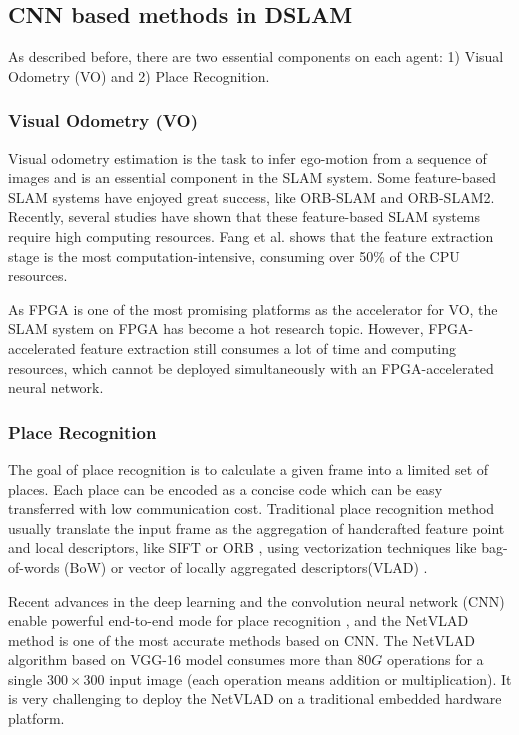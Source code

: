 \label{sec:background}
\subsection{CNN based methods in DSLAM}
As described before, there are two essential components on each agent: 1) Visual Odometry (VO) and 2) Place Recognition.

\subsubsection{Visual Odometry (VO)}

Visual odometry estimation is the task to infer ego-motion from a sequence of images and is an essential component in the SLAM system. Some feature-based SLAM systems have enjoyed great success, like ORB-SLAM\cite{DBLP:journals/trob/Mur-ArtalMT15} and ORB-SLAM2\cite{Mur-Artal:2017281}. Recently, several studies have shown that these feature-based SLAM systems require high computing resources. Fang et al.\cite{Fang2017FPGAbasedOF} shows that the feature extraction stage is the most computation-intensive, consuming over 50\% of the CPU resources.

As FPGA is one of the most promising platforms as the accelerator for VO, the SLAM system on FPGA has become a hot research topic. However, FPGA-accelerated feature extraction still consumes a lot of time and computing resources, which cannot be deployed simultaneously with an FPGA-accelerated neural network.

\subsubsection{Place Recognition}

The goal of place recognition is to calculate a given frame into a limited set of places. Each place can be encoded as a concise code which can be easy transferred with low communication cost. Traditional place recognition method usually translate the input frame as the aggregation of handcrafted feature point and local descriptors, like SIFT \cite{Lowe:2004e6e} or ORB \cite{Mur-Artal:2017281}, using vectorization techniques like bag-of-words (BoW) \cite{Galvez-Lopez:2012c94} or vector of locally aggregated descriptors(VLAD) \cite{Jegou:2010f45}.

Recent advances in the deep learning and the convolution neural network (CNN) enable powerful end-to-end mode for place recognition \cite{Noh:2017d0b, Arandjelovic:2017997}, and the NetVLAD method is one of the most accurate methods based on CNN. The NetVLAD algorithm based on VGG-16 model \cite{Simonyan:20143be} consumes more than $80G$ operations for a single $300 \times 300$ input image (each operation means addition or  multiplication). It is very challenging to deploy the NetVLAD on a traditional embedded hardware platform.

